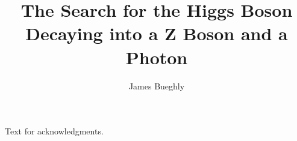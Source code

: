 \documentclass[12pt]{template/nuthesis}
\author{James Bueghly}
\title{The Search for the Higgs Boson Decaying into a Z Boson and a Photon}
\begin{document}
%	
%


\frontmatter		%

\maketitle		%

\copyrightpage		%




\acknowledgements	%

Text for acknowledgments.

%


%
%
%
%
%
%
%
%

\clearpage{} %
\tableofcontents	%

\clearpage{} %
\listoftables		%

\clearpage{} %
\listoffigures		%



\mainmatter             %


\end{document}
